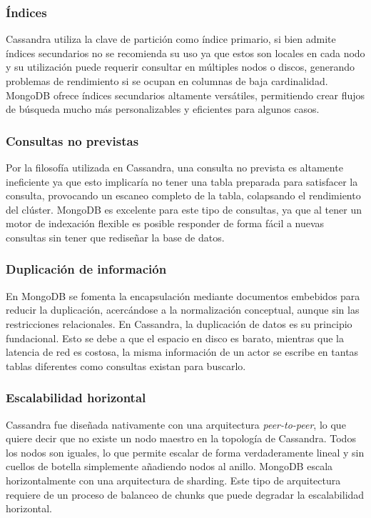\documentclass[11pt,a4paper]{article}
\begin{document}
\subsubsection{Índices}
Cassandra utiliza la clave de partición como índice primario, si bien admite índices secundarios no se recomienda
su uso ya que estos son locales en cada nodo y su utilización puede requerir consultar en múltiples nodos o discos, 
generando problemas de rendimiento si se ocupan en columnas de baja cardinalidad. MongoDB ofrece índices secundarios
altamente versátiles, permitiendo crear flujos de búsqueda mucho más personalizables y eficientes para algunos casos.

\subsubsection{Consultas no previstas}
Por la filosofía utilizada en Cassandra, una consulta no prevista es altamente ineficiente ya que esto implicaría no
tener una tabla preparada para satisfacer la consulta, provocando un escaneo completo de la tabla, colapsando el 
rendimiento del clúster. MongoDB es excelente para este tipo de consultas, ya que al tener un motor de indexación flexible
es posible responder de forma fácil a nuevas consultas sin tener que rediseñar la base de datos.

\subsubsection{Duplicación de información}
En MongoDB se fomenta la encapsulación mediante documentos embebidos para reducir la duplicación, acercándose a la normalización
conceptual, aunque sin las restricciones relacionales. En Cassandra, la duplicación de datos es su principio fundacional. Esto se
debe a que el espacio en disco es barato, mientras que la latencia de red es costosa, la misma información de un actor se escribe 
en tantas tablas diferentes como consultas existan para buscarlo.

\subsubsection{Escalabilidad horizontal}
Cassandra fue diseñada nativamente con una arquitectura \textit{peer-to-peer}, lo que quiere decir que no existe un nodo maestro
en la topología de Cassandra. Todos los nodos son iguales, lo que permite escalar de forma verdaderamente lineal y sin cuellos de botella
simplemente añadiendo nodos al anillo. MongoDB escala horizontalmente con una arquitectura de sharding. Este tipo de arquitectura requiere
de un proceso de balanceo de chunks que puede degradar la escalabilidad horizontal.
\end{document}
